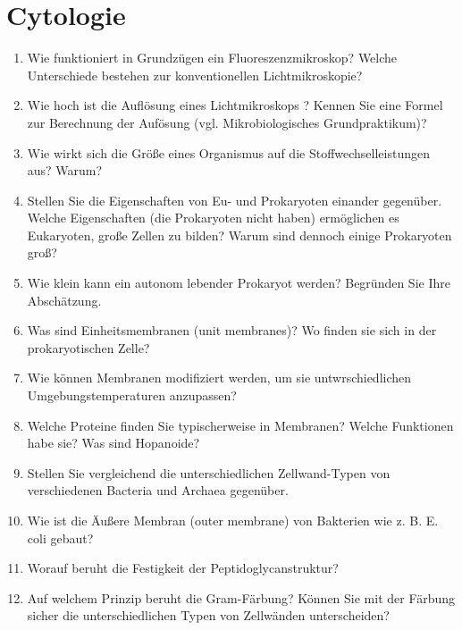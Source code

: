 
\section{Cytologie}
	\begin{enumerate}
		\item Wie funktioniert in Grundzügen ein Fluoreszenzmikroskop? Welche Unterschiede bestehen zur konventionellen Lichtmikroskopie?
		\item Wie hoch ist die Auflösung eines Lichtmikroskops ? Kennen Sie eine Formel zur Berechnung der Aufösung (vgl. Mikrobiologisches Grundpraktikum)?
		\item Wie wirkt sich die Größe eines Organismus auf die Stoffwechselleistungen aus? Warum?
		\item Stellen Sie die Eigenschaften von Eu- und Prokaryoten einander gegenüber. Welche Eigenschaften (die Prokaryoten nicht haben) ermöglichen es Eukaryoten, große Zellen zu bilden? Warum sind dennoch einige Prokaryoten groß?
		\item Wie klein kann ein autonom lebender Prokaryot werden? Begründen Sie Ihre Abschätzung.
		\item Was sind Einheitsmembranen (unit membranes)? Wo finden sie sich in der prokaryotischen Zelle?
		\item Wie können Membranen modifiziert werden, um sie untwrschiedlichen Umgebungstemperaturen anzupassen?
		\item Welche Proteine finden Sie typischerweise in Membranen? Welche Funktionen habe sie? Was sind Hopanoide?
		\item Stellen Sie vergleichend die unterschiedlichen Zellwand-Typen von verschiedenen Bacteria und Archaea gegenüber.
		\item Wie ist die Äußere Membran (outer membrane) von Bakterien wie  z. B. E. coli gebaut?
		\item Worauf beruht  die Festigkeit der Peptidoglycanstruktur? 
		\item Auf welchem Prinzip beruht die Gram-Färbung? Können Sie mit der Färbung sicher die unterschiedlichen Typen von Zellwänden unterscheiden?
	\end{enumerate}
